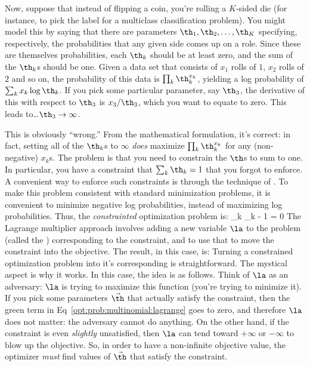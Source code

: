 Now, suppose that instead of flipping a coin, you're rolling a
$K$-sided die (for instance, to pick the label for a multiclass
classification problem).  You might model this by saying that there
are parameters $\th_1, \th_2, \dots, \th_K$ specifying, respectively,
the probabilities that any given side comes up on a role.  Since these
are themselves probabilities, each $\th_k$ should be at least zero,
and the sum of the $\th_k$s should be one.  Given a data set that
consists of $x_1$ rolls of $1$, $x_2$ rolls of $2$ and so on, the
probability of this data is $\prod_k \th_k^{x_k}$, yielding a log
probability of $\sum_k x_k \log \th_k$.  If you pick some particular
parameter, say $\th_3$, the derivative of this with respect to $\th_3$
is $x_3 / \th_3$, which you want to equate to zero.  This leads
to\dots $\th_3 \rightarrow \infty$.

This is obviously ``wrong.''  From the mathematical formulation, it's
correct: in fact, setting all of the $\th_k$s to $\infty$ \emph{does}
maximize $\prod_k \th_k^{x_k}$ for any (non-negative) $x_k$s.  The
problem is that you need to constrain the $\th$s to sum to one.  In
particular, you have a constraint that $\sum_k \th_k = 1$ that you
forgot to enforce.  A convenient way to enforce such constraints is
through the technique of .  To make this
problem consistent with standard minimization problems, it is
convenient to minimize negative log probabilities, instead of
maximizing log probabilities.  Thus, the \emph{constrainted}
optimization problem is:
%
%
{\textcolor{darkergreen}{\sum_k \th_k - 1 = 0}}
%
The Lagrange multiplier approach involves adding a new variable $\la$
to the problem (called the ) corresponding
to the constraint, and to use that to move the constraint into the
objective.  The result, in this case, is:
%
%
Turning a constrained optimization problem into it's corresponding
 is straightforward.  The mystical aspect is why
it works.  In this case, the idea is as follows.  Think of $\la$ as an
adversary: $\la$ is trying to maximize this function (you're trying to
minimize it).  If you pick some parameters $\vec\th$ that actually
satisfy the constraint, then the green term in
Eq~\eqref{opt:prob:multinomial:lagrange} goes to zero, and therefore
$\la$ does not matter: the adversary cannot do anything.  On the other
hand, if the constraint is even \emph{slightly} unsatisfied, then
$\la$ can tend toward $+\infty$ or $-\infty$ to blow up the objective.
So, in order to have a non-infinite objective value, the optimizer
\emph{must} find values of $\vec\th$ that satisfy the constraint.

